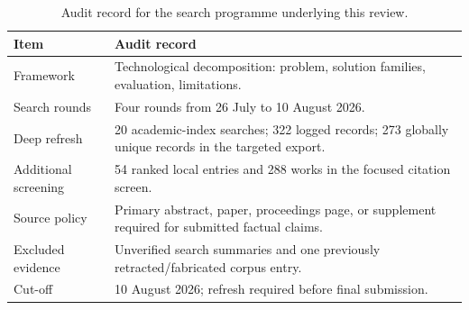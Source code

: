 \documentclass[11pt,a4paper,oneside]{report}
\begin{document}
\begin{table}[htbp]
\centering
\small
\caption{Audit record for the search programme underlying this review.}
\label{tab:audit}
\begin{tabularx}{\textwidth}{L{3.0cm}Y}
\toprule
\textbf{Item} & \textbf{Audit record} \\
\midrule
Framework & Technological decomposition: problem, solution families, evaluation, limitations. \\
Search rounds & Four rounds from 26 July to 10 August 2026. \\
Deep refresh & 20 academic-index searches; 322 logged records; 273 globally unique records in the targeted export. \\
Additional screening & 54 ranked local entries and 288 works in the focused citation screen. \\
Source policy & Primary abstract, paper, proceedings page, or supplement required for submitted factual claims. \\
Excluded evidence & Unverified search summaries and one previously retracted/fabricated corpus entry. \\
Cut-off & 10 August 2026; refresh required before final submission. \\
\bottomrule
\end{tabularx}
\end{table}
\end{document}
